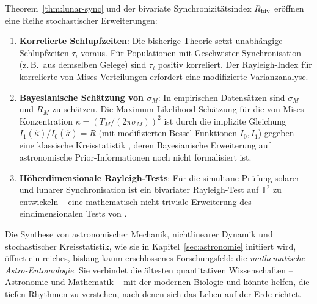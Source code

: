 ﻿\documentclass[12pt, a4paper]{article}
\theoremstyle{definition}
\begin{document}
Theorem~\ref{thm:lunar-sync} und der bivariate Synchronizitätsindex $R_{\rm biv}$
eröffnen eine Reihe stochastischer Erweiterungen:

\begin{enumerate}
  \item \textbf{Korrelierte Schlupfzeiten}: Die bisherige Theorie setzt unabhängige
        Schlupfzeiten $\tau_i$ voraus. Für Populationen mit Geschwister-Synchronisation
        (z.\,B.\ aus demselben Gelege) sind $\tau_i$ positiv korreliert. Der
        Rayleigh-Index für korrelierte von-Mises-Verteilungen erfordert eine
        modifizierte Varianzanalyse.

  \item \textbf{Bayesianische Schätzung von $\sigma_M$}: In empirischen Datensätzen
        sind $\sigma_M$ und $R_M$ zu schätzen. Die Maximum-Likelihood-Schätzung
        für die von-Mises-Konzentration $\kappa = (T_M/(2\pi\sigma_M))^2$ ist
        durch die implizite Gleichung $I_1(\hat\kappa)/I_0(\hat\kappa) = \bar{R}$
        (mit modifizierten Bessel-Funktionen $I_0, I_1$) gegeben -- eine
        klassische Kreisstatistik \cite{Mardia1972}, deren Bayesianische
        Erweiterung auf astronomische Prior-Informationen noch nicht formalisiert ist.

  \item \textbf{Höherdimensionale Rayleigh-Tests}: Für die simultane Prüfung
        solarer und lunarer Synchronisation ist ein bivariater Rayleigh-Test
        auf $\mathbb{T}^2$ zu entwickeln -- eine mathematisch nicht-triviale
        Erweiterung des eindimensionalen Tests von \cite{Mardia1972}.
\end{enumerate}

Die Synthese von astronomischer Mechanik, nichtlinearer Dynamik und stochastischer
Kreisstatistik, wie sie in Kapitel~\ref{sec:astronomie} initiiert wird, öffnet
ein reiches, bislang kaum erschlossenes Forschungsfeld: die \emph{mathematische
Astro-Entomologie}. Sie verbindet die ältesten quantitativen Wissenschaften --
Astronomie und Mathematik -- mit der modernen Biologie und könnte helfen,
die tiefen Rhythmen zu verstehen, nach denen sich das Leben auf der Erde richtet.
\end{document}

